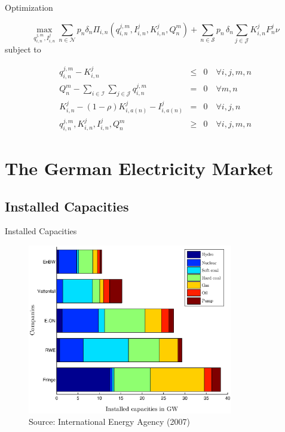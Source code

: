 \begin{frame}{Optimization}

\begin{equation}
  \label{eq:objfct}
  \max_{q_{i,n}^{j,m}, I_{i,n}^{j}} \sum_{n\in \mathcal{N}}p_n\delta_n\Pi_{i,n}\left(q_{i,n}^{j,m}, I_{i,n}^{j}, K_{i,n}^{j}, Q_n^m\right)+ \sum_{n\in \mathcal{S}}p_n\,\delta_n \sum_{j\in \mathcal{J}}K_{i,n}^{j}F_n^{j}\nu
\end{equation}
subject to
  
\begin{eqnarray}  
q_{i,n}^{j,m} - K_{i,n}^{j} &\leq& 0 \quad \forall i,j,m,n \label{eq:prodconstr} \\
Q_n^m-\sum_{i\in \mathcal{I}}\sum_{j\in \mathcal{J}} q_{i,n}^{j,m} &=& 0 \quad \forall m,n \label{eq:marketclearing}\\
K_{i,n}^{j} - (1-\rho)K_{i,a(n)}^{j}-I_{i,a(n)}^{j} &=& 0 \quad \forall i,j,n \label{eq:state} \\
q_{i,n}^{j,m}, K_{i,n}^{j}, I_{i,n}^{j}, Q_n^m  &\geq& 0 \quad \forall i,j,m,n\label{eq:nonneg}
\end{eqnarray}
  
\end{frame}



\section{The German Electricity Market}

\subsection{Installed Capacities}

\begin{frame}{Installed Capacities}
					
\begin{figure}[h]
  \centering
\includegraphics[width=0.8\textwidth]{capacities}
  \label{fig:capacities}
\\
\vspace{0.1cm}
\scriptsize Source: International Energy Agency (2007)
\end{figure}

\end{frame}

